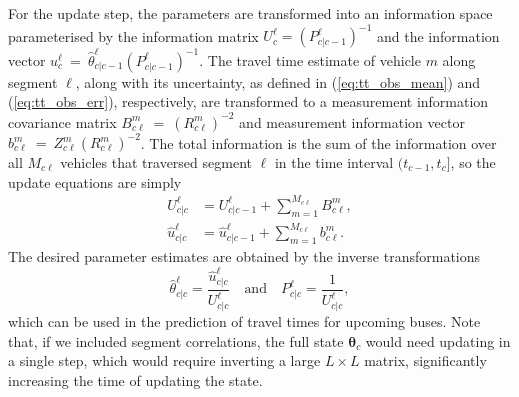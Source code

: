 For the update step, the parameters are transformed into an information
space parameterised by the information matrix $U^\ell_c = (P_{c|c-1}^\ell)^{-1}$
and the information vector $u^\ell_c~=~\hat \theta^\ell_{c|c-1} (P^\ell_{c|c-1})^{-1}$.
The travel time estimate of vehicle $m$ along segment $\ell$,
along with its uncertainty,
as defined in (\ref{eq:tt_obs_mean}) and (\ref{eq:tt_obs_err}), respectively,
are transformed to a measurement information covariance matrix
$B_{c\ell}^{m}~=~(R_{c\ell}^m)^{-2}$
and measurement information vector $b_{c\ell}^{m}~=~Z_{c\ell}^{m} (R_{c\ell}^{m})^{-2}$.
The total information is the sum of the information over all $M_{c\ell}$ vehicles
that traversed segment $\ell$ in the time interval $(t_{c-1}, t_c]$,
so the update equations are simply
\begin{align*}
U^\ell_{c|c} &= U^\ell_{c|c-1} + \sum_{m=1}^{M_{c\ell}} B_{c\ell}^{m}, \\
\hat u^\ell_{c|c} &= \hat u^\ell_{c|c-1} + \sum_{m=1}^{M_{c\ell}} b_{c\ell}^{m}.
\end{align*}
The desired parameter estimates are obtained
by the inverse transformations
\begin{equation*}
\hat \theta^\ell_{c|c} = \frac{\hat u^\ell_{c|c}}{U^\ell_{c|c}}
\quad\text{and}\quad
P^\ell_{c|c} = \frac{1}{U^\ell_{c|c}},
\end{equation*}
which can be used in the prediction of travel times
for upcoming buses.
Note that, if we included segment correlations,
the full state $\boldsymbol{\theta}_c$ would need updating in a single step,
which would require inverting a large $L\times L$ matrix,
significantly increasing the time of updating the state.

